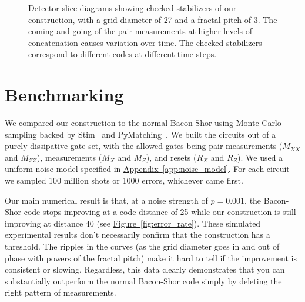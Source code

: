 \documentclass[onecolumn,unpublished,a4paper]{quantumarticle}
\theoremstyle{definition}
\theoremstyle{definition}
\theoremstyle{definition}
\DeclareRobustCommand{\app}[1]{\hyperref[app:#1]{Appendix~\ref*{app:#1}}}
\newcommand{\fig}[1]{\hyperref[fig:#1]{Figure~\ref*{fig:#1}}}
\begin{document}
\begin{figure}[H]
    \centering
    \caption{
        Detector slice diagrams showing checked stabilizers of our construction, with a grid diameter of 27 and a fractal pitch of 3.
        The coming and going of the pair measurements at higher levels of concatenation causes variation over time.
        The checked stabilizers correspond to different codes at different time steps.
    }
    \label{fig:detslice}
\end{figure}


\section{Benchmarking}
\label{sec:benchmark}

We compared our construction to the normal Bacon-Shor using Monte-Carlo sampling backed by Stim~\cite{gidney2021stim} and PyMatching~\cite{higgott2021pymatching,higgott2023sparseblossom}.
We built the circuits out of a purely dissipative gate set, with the allowed gates being pair measurements ($M_{XX}$ and $M_{ZZ}$), measurements ($M_X$ and $M_Z$), and resets ($R_{X}$ and $R_{Z}$).
We used a uniform noise model specified in \app{noise_model}.
For each circuit we sampled 100 million shots or 1000 errors, whichever came first.

Our main numerical result is that, at a noise strength of $p=0.001$, the Bacon-Shor code stops improving at a code distance of 25 while our construction is still improving at distance 40 (see \fig{error_rate}).
These simulated experimental results don't necessarily confirm that the construction has a threshold.
The ripples in the curves (as the grid diameter goes in and out of phase with powers of the fractal pitch) make it hard to tell if the improvement is consistent or slowing.
Regardless, this data clearly demonstrates that you can substantially outperform the normal Bacon-Shor code simply by deleting the right pattern of measurements.
\end{document}
